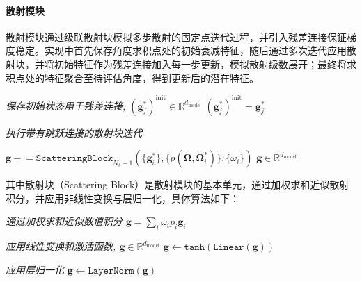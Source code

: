 \paragraph{散射模块} 散射模块通过级联散射块模拟多步散射的固定点迭代过程，并引入残差连接保证梯度稳定。实现中首先保存角度求积点处的初始衰减特征，随后通过多次迭代应用散射块，并将初始特征作为残差连接加入每一步更新，模拟散射级数展开；最终将求积点处的特征聚合至待评估角度，得到更新后的潜在特征。

\begin{algorithm}[htp!]
    \caption{散射模块（Scattering Module）}\label{alg:code-scattering-module}
    \SetAlgoLined

    \emph{保存初始状态用于残差连接, ${(\bm{g}^*_j)}^{\text{init}}\in \mathbb{R}^{d_{\text{model}}}$}\;
    ${(\bm{g}^*_j)}^{\text{init}} = \bm{g}^*_j$\;

    \emph{执行带有跳跃连接的散射块迭代}\;

    $\bm{g}\mathrel{+}=\texttt{ScatteringBlock}_{N_\ell-1}(\{\bm{g}^*_i\},\{p(\boldsymbol{\Omega},\boldsymbol{\Omega}^*_i)\}, \{\omega_i\})$ \hfill \emph{$\bm{g}\in \mathbb{R}^{d_{\text{model}}}$} \;

    \;
\end{algorithm}

其中散射块（Scattering Block）是散射模块的基本单元，通过加权求和近似散射积分，并应用非线性变换与层归一化，具体算法如下：

\begin{algorithm}[htp!]
    \caption{散射块（Scattering Block）}\label{alg:code-scattering-block}
    \SetAlgoLined

    \emph{通过加权求和近似数值积分}\;
    $\bm{g}  = \sum_i \omega_i p_i \bm{g}_i$\;

    \emph{应用线性变换和激活函数, $\bm{g}\in \mathbb{R}^{d_{\text{model}}}$}\;
    $\bm{g}\gets \texttt{tanh}\left(\texttt{Linear}( \bm{g})\right)$\;

    \emph{应用层归一化}\;
    $\bm{g} \gets \texttt{LayerNorm}(\bm{g})$\;

    \;
\end{algorithm}

